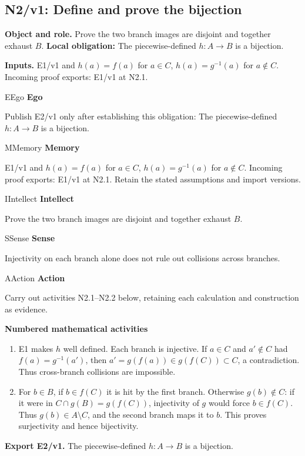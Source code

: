 \documentclass[preprint,12pt,aps,pra,showkeys,amsmath,amssymb,superscriptaddress,floatfix]{revtex4-2}
\theoremstyle{definition}
\theoremstyle{remark}
\newcommand{\mmfaculty}[3]{%
 \begin{mmfacultybox}{#1}{#2}
 {\sffamily\bfseries\color{MMBlue}#2}\par\smallskip #3
 \end{mmfacultybox}}
\newcommand{\field}[2]{\par\smallskip\noindent\textbf{#1.} #2\par}
\begin{document}
\clearpage

\subsection{N2/v1: Define and prove the bijection}

\field{Object and role}{Prove the two branch images are disjoint and together exhaust \(B\).
\textbf{Local obligation:} The piecewise-defined \(h:A\to B\) is a
bijection.}

\field{Inputs}{E1/v1 and \(h(a)=f(a)\) for \(a\in C\), \(h(a)=g^{-1}(a)\) for
\(a\notin C\). Incoming proof exports: E1/v1 at N2.1.}

\mmfaculty{E}{Ego}{Publish E2/v1 only after establishing this obligation: The
piecewise-defined \(h:A\to B\) is a bijection.}

\mmfaculty{M}{Memory}{E1/v1 and \(h(a)=f(a)\) for \(a\in C\), \(h(a)=g^{-1}(a)\) for
\(a\notin C\). Incoming proof exports: E1/v1 at N2.1. Retain the stated
assumptions and import versions.}

\mmfaculty{I}{Intellect}{Prove the two branch images are disjoint and together exhaust \(B\).}

\mmfaculty{S}{Sense}{Injectivity on each branch alone does not rule out collisions across
branches.}

\mmfaculty{A}{Action}{Carry out activities N2.1--N2.2 below, retaining each calculation and
construction as evidence.}

\smallskip\noindent\textbf{Numbered mathematical activities}

\begin{enumerate}[label=N2.\arabic*,leftmargin=3.4em]

\item E1 makes \(h\) well defined. Each branch is injective. If \(a\in C\) and
\(a'\notin C\) had \(f(a)=g^{-1}(a')\), then
\(a'=g(f(a))\in g(f(C))\subset C\), a contradiction. Thus cross-branch
collisions are impossible.

\item For \(b\in B\), if \(b\in f(C)\) it is hit by the first branch.
Otherwise \(g(b)\notin C\): if it were in \(C\cap g(B)=g(f(C))\),
injectivity of \(g\) would force \(b\in f(C)\). Thus
\(g(b)\in A\setminus C\), and the second branch maps it to \(b\). This
proves surjectivity and hence bijectivity.

\end{enumerate}

\field{Export E2/v1}{The piecewise-defined \(h:A\to B\) is a bijection.}
\end{document}
